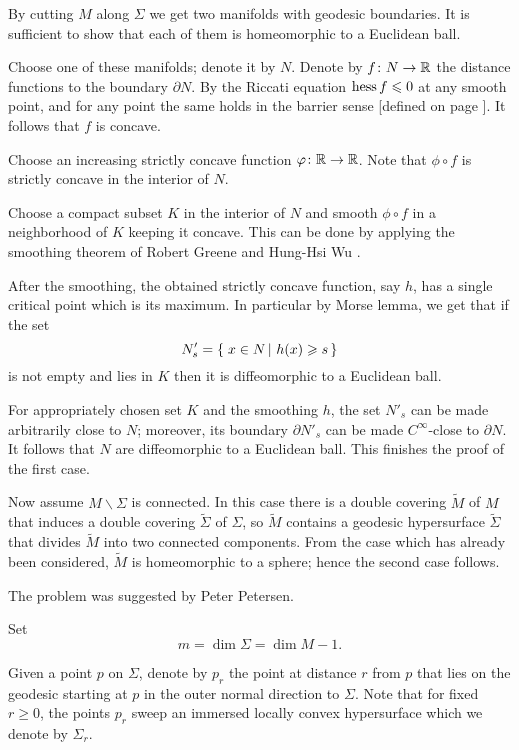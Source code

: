 By cutting $M$ along $\Sigma$ 
we get two manifolds
with geodesic boundaries.
It is sufficient to show that each of them is homeomorphic to a Euclidean ball.

Choose one of these manifolds; denote it by $N$.
Denote by $f\:N\z\to\RR$ the distance functions to the boundary $\partial N$.
By the Riccati equation $\operatorname{\rm hess}\nolimits f\leqslant 0$ at any smooth point,
and for any point the same holds in the barrier sense [defined on page \pageref{page:barrier sense}].
It follows that $f$ is concave.

Choose an increasing strictly concave function $\varphi\colon\mathbb{R}\to\mathbb{R}$.
Note that $\phi\circ f$ is strictly concave in the interior of $N$.

Choose a compact subset $K$ in the interior of $N$ and
smooth $\phi\circ f$ in a neighborhood of $K$ keeping it concave. 
This can be done by applying the smoothing theorem of Robert Greene and Hung-Hsi Wu \cite[Theorem~2]{greene-wu}.

After the smoothing, the obtained strictly concave function, say $h$, has a single critical point which is its maximum.
In particular by Morse lemma, we get that if the set  
\[N'_s=\set{x\in N}{h(x)\ge s}\]
is not empty and lies in $K$ then it is diffeomorphic to a Euclidean ball.

For appropriately chosen set $K$ and the smoothing $h$, the set $N'_s$ can be made arbitrarily close to $N$;
moreover, its boundary $\partial N'_s$ can be made $C^\infty$-close to $\partial N$.
It follows that $N$ are diffeomorphic to a Euclidean ball.
This finishes the proof of the first case.

Now assume $M\backslash\Sigma$ is connected.
In this case there is a double covering $\tilde M$ of $M$ that induces a double covering $\tilde\Sigma$ of $\Sigma$,
so $\tilde M$ contains a geodesic hypersurface $\tilde\Sigma$ that divides $\tilde M$ into two connected components. 
From the case which has already been considered, $\tilde M$ is homeomorphic to a sphere;
hence the second case follows.
\qeds

The problem was suggested by Peter Petersen.



Set 
\[m=\dim \Sigma=\dim M-1.\]

Given a point $p$ on $\Sigma$, denote by $p_r$ the point at distance $r$ from $p$
that lies on the geodesic starting at $p$ in the outer normal direction to $\Sigma$.
Note that for fixed $r\ge 0$,
the points $p_r$ sweep an immersed locally convex hypersurface which we denote by $\Sigma_r$.

